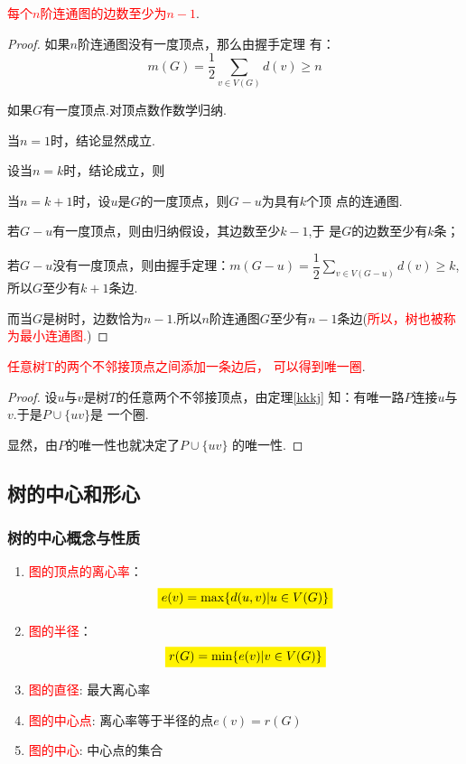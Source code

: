 \begin{theorem}
\textcolor{red}{每个$n$阶连通图的边数至少为$n-1$}.
\end{theorem}
\begin{proof}
   如果$n$阶连通图没有一度顶点，那么由握手定理
   有：
   \[
   m(G) = \dfrac{1}{2}\sum\limits_{v\in V(G)}d(v)\geq n
   \]
   
   如果$G$有一度顶点.对顶点数作数学归纳.
   
   当$n=1$时，结论显然成立.
   
   设当$n=k$时，结论成立，则
   
   当$n=k+1$时，设$u$是$G$的一度顶点，则$G-u$为具有$k$个顶
   点的连通图.
   
   若$G-u$有一度顶点，则由归纳假设，其边数至少$k-1$,于
   是$G$的边数至少有$k$条；
   
   若$G-u$没有一度顶点，则由握手定理：$m(G-u)=\dfrac{1}{2}\sum\limits_{v\in V(G-u)}d(v)\geq k$,所以$G$至少有$k+1$条边.
   
   而当$G$是树时，边数恰为$n-1$.所以$n$阶连通图$G$至少有$n-1$条边(\textcolor{red}{所以，树也被称为最小连通图.})
   
\end{proof}



\begin{theorem}
	\textcolor{red}{任意树T的两个不邻接顶点之间添加一条边后，
		可以得到唯一圈}.
\end{theorem}
\begin{proof}
设$u$与$v$是树$T$的任意两个不邻接顶点，由定理\ref{kkkj}
知：有唯一路$P$连接$u$与$v$.于是$P\cup\{uv\}$是 一个圈.

显然，由$P$的唯一性也就决定了$P\cup\{uv\}$ 的唯一性.
\end{proof}


\subsection{树的中心和形心}
\subsubsection{树的中心概念与性质}

\begin{enumerate}
	\item \textcolor{red}{图的顶点的离心率}：
	\[
	\colorbox{yellow}{$ e(v)=\mathrm{max} \{d(u,v)|u\in V(G)\}  $}
	\]
	\item \textcolor{red}{图的半径}：
	\[
	\colorbox{yellow}{$ r(G)=\mathrm{min} \{e(v)|v\in V(G)\}  $}
	\]
	\item \textcolor{red}{图的直径}: 最大离心率
	\item \textcolor{red}{图的中心点}: 离心率等于半径的点$e(v)= r(G)$
	\item \textcolor{red}{图的中心}: 中心点的集合
\end{enumerate}


